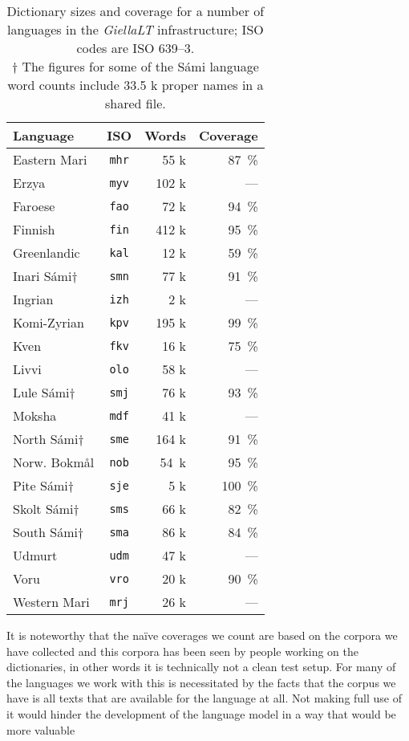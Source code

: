 \documentclass[free]{flammie}
\begin{document}
\begin{table}[htb]
\small
    \centering
    \begin{tabular}{lcrr}
    Language & ISO & Words & Coverage  \\
\toprule
Eastern Mari & \texttt{mhr} &  55 k & 87~\%\\
Erzya        & \texttt{myv} & 102 k & --- \\
Faroese      & \texttt{fao} &  72 k & 94~\%\\
Finnish      & \texttt{fin} & 412 k & 95~\%\\
Greenlandic  & \texttt{kal} &  12 k & 59~\%\\
Inari Sámi†  & \texttt{smn} &  77 k & 91~\%\\
Ingrian      & \texttt{izh} &   2 k & --- \\
Komi-Zyrian  & \texttt{kpv} & 195 k & 99~\%\\
Kven         & \texttt{fkv} &  16 k & 75~\%\\
Livvi        & \texttt{olo} &  58 k & --- \\
Lule Sámi†   & \texttt{smj} &  76 k & 93~\%\\
Moksha       & \texttt{mdf} &  41 k & --- \\
North Sámi†  & \texttt{sme} & 164 k & 91~\%\\
Norw. Bokmål & \texttt{nob} & 54~k & 95~\%\\
Pite Sámi†   & \texttt{sje} &   5 k & 100~\%\\
Skolt Sámi†  & \texttt{sms} &  66 k & 82~\%\\
South Sámi†  & \texttt{sma} &  86 k & 84~\%\\
Udmurt       & \texttt{udm} &  47 k & --- \\
Voru         & \texttt{vro} &  20 k & 90~\%\\
Western Mari & \texttt{mrj} &  26 k & --- \\
    \end{tabular}
    \caption{Dictionary sizes and coverage for a number of languages in the
    \textit{GiellaLT} infrastructure; ISO codes are ISO 639--3. \\ † The figures
    for some of the Sámi language word counts include 33.5 k proper names in a
    shared file.\label{tab:evals}}
\end{table}

It is noteworthy that the naïve coverages we count are based on the corpora we
have collected and this corpora has been seen by people working on the
dictionaries, in other words it is technically not a clean test setup.  For many
of the languages we work with this is necessitated by the facts that the corpus
we have is all texts that are available for the language at all. Not making full
use of it would hinder the development of the language model in a way that would
be more valuable
\end{document}
